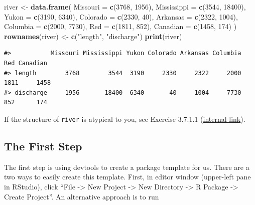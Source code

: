 \documentclass[
]{book}
\newenvironment{Shaded}{\begin{snugshade}}{\end{snugshade}}
\newcommand{\DataTypeTok}[1]{\textcolor[rgb]{0.13,0.29,0.53}{#1}}
\newcommand{\DecValTok}[1]{\textcolor[rgb]{0.00,0.00,0.81}{#1}}
\newcommand{\KeywordTok}[1]{\textcolor[rgb]{0.13,0.29,0.53}{\textbf{#1}}}
\newcommand{\NormalTok}[1]{#1}
\newcommand{\StringTok}[1]{\textcolor[rgb]{0.31,0.60,0.02}{#1}}
\begin{document}
\begin{Shaded}
\begin{Highlighting}[]
\NormalTok{river <-}\StringTok{ }\KeywordTok{data.frame}\NormalTok{(}
  \DataTypeTok{Missouri =} \KeywordTok{c}\NormalTok{(}\DecValTok{3768}\NormalTok{, }\DecValTok{1956}\NormalTok{),}
  \DataTypeTok{Mississippi =} \KeywordTok{c}\NormalTok{(}\DecValTok{3544}\NormalTok{, }\DecValTok{18400}\NormalTok{),}
  \DataTypeTok{Yukon =} \KeywordTok{c}\NormalTok{(}\DecValTok{3190}\NormalTok{, }\DecValTok{6340}\NormalTok{),}
  \DataTypeTok{Colorado =} \KeywordTok{c}\NormalTok{(}\DecValTok{2330}\NormalTok{, }\DecValTok{40}\NormalTok{),}
  \DataTypeTok{Arkansas =} \KeywordTok{c}\NormalTok{(}\DecValTok{2322}\NormalTok{, }\DecValTok{1004}\NormalTok{),}
  \DataTypeTok{Columbia =} \KeywordTok{c}\NormalTok{(}\DecValTok{2000}\NormalTok{, }\DecValTok{7730}\NormalTok{),}
  \DataTypeTok{Red =} \KeywordTok{c}\NormalTok{(}\DecValTok{1811}\NormalTok{, }\DecValTok{852}\NormalTok{),}
  \DataTypeTok{Canadian =} \KeywordTok{c}\NormalTok{(}\DecValTok{1458}\NormalTok{, }\DecValTok{174}\NormalTok{)}
\NormalTok{) }
\KeywordTok{rownames}\NormalTok{(river) <-}\StringTok{ }\KeywordTok{c}\NormalTok{(}\StringTok{"length"}\NormalTok{, }\StringTok{"discharge"}\NormalTok{)}
\KeywordTok{print}\NormalTok{(river)}
\end{Highlighting}
\end{Shaded}

\begin{verbatim}
#>           Missouri Mississippi Yukon Colorado Arkansas Columbia  Red Canadian
#> length        3768        3544  3190     2330     2322     2000 1811     1458
#> discharge     1956       18400  6340       40     1004     7730  852      174
\end{verbatim}

If the structure of \texttt{river} is atypical to you, see Exercise 3.7.1.1 (\protect\hyperlink{ex-set14}{internal link}).

\hypertarget{first-step}{%
\subsection{The First Step}\label{first-step}}

The first step is using devtools to create a package template for us. There are a two ways to easily create this template. First, in editor window (upper-left pane in RStudio), click ``File -\textgreater{} New Project -\textgreater{} New Directory -\textgreater{} R Package -\textgreater{} Create Project''. An alternative approach is to run
\end{document}
